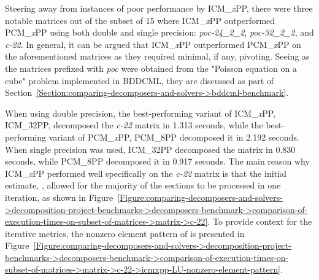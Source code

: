 Steering away from instances of poor performance by ICM\_\textit{x}PP, there were three notable matrices out of the subset of 15 where ICM\_\textit{x}PP outperformed PCM\_\textit{x}PP using both double and single precision: \textit{poc-24\_2\_2}, \textit{poc-32\_2\_2}, and \textit{c-22}.
In general, it can be argued that ICM\_\textit{x}PP outperformed PCM\_\textit{x}PP on the aforementioned matrices as they required minimal, if any, pivoting.
Seeing as the matrices prefixed with \textit{poc} were obtained from the "Poisson equation on a cube" problem implemented in BDDCML, they are discussed as part of Section~\ref{Section:comparing-decomposers-and-solvers->bddcml-benchmark}.

When using double precision, the best-performing variant of ICM\_\textit{x}PP, ICM\_32PP, decomposed the \textit{c-22} matrix in 1.313 seconds, while the best-performing variant of PCM\_\textit{x}PP, PCM\_8PP decomposed it in 2.192 seconds.
When single precision was used, ICM\_32PP decomposed the matrix in 0.830 seconds, while PCM\_8PP decomposed it in 0.917 seconds.
The main reason why ICM\_\textit{x}PP performed well specifically on the \textit{c-22} matrix is that the initial estimate, , allowed for the majority of the sections to be processed in one iteration, as shown in Figure~\ref{Figure:comparing-decomposers-and-solvers->decomposition-project-benchmarks->decomposers-benchmark->comparison-of-execution-times-on-subset-of-matrices->matrix->c-22}.
To provide context for the iterative metrics, the nonzero element pattern of  is presented in Figure~\ref{Figure:comparing-decomposers-and-solvers->decomposition-project-benchmarks->decomposers-benchmark->comparison-of-execution-times-on-subset-of-matrices->matrix->c-22->icmxpp-LU-nonzero-element-pattern}.

